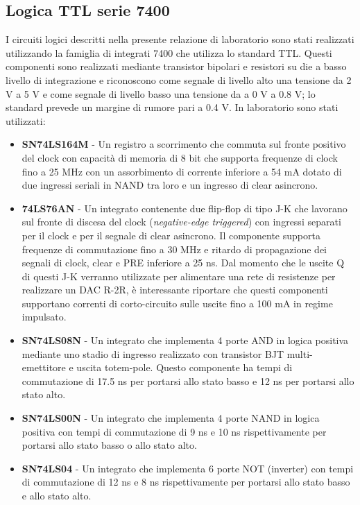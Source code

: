 \documentclass[journal]{IEEEtran}
\begin{document}
\subsection{Logica TTL serie 7400}
I circuiti logici descritti nella presente relazione di laboratorio sono stati realizzati utilizzando la famiglia di integrati 7400 che utilizza lo standard TTL. Questi componenti sono realizzati mediante transistor bipolari e resistori su die a basso livello di integrazione e riconoscono come segnale di livello alto una tensione da 2 V a 5 V e come segnale di livello basso una tensione da a 0 V a 0.8 V; lo standard prevede un margine di rumore pari a 0.4 V. In laboratorio sono stati utilizzati:
\begin{itemize}
    \item \textbf{SN74LS164M} - Un registro a scorrimento che commuta sul fronte positivo del clock con capacità di memoria di 8 bit che supporta frequenze di clock fino a 25 MHz con un assorbimento di corrente inferiore a 54 mA dotato di due ingressi seriali in NAND tra loro e un ingresso di clear asincrono. \cite{D}
    
    \item \textbf{74LS76AN} - Un integrato contenente due flip-flop di tipo J-K che lavorano sul fronte di discesa del clock (\textit{negative-edge triggered}) con ingressi separati per il clock e per il segnale di clear asincrono. Il componente supporta frequenze di commutazione fino a 30 MHz e ritardo di propagazione dei segnali di clock, clear e PRE inferiore a 25 ns. Dal momento che le uscite Q di questi J-K verranno utilizzate per alimentare una rete di resistenze per realizzare un DAC R-2R, è interessante riportare che questi componenti supportano correnti di corto-circuito sulle uscite fino a 100 mA in regime impulsato.
    \cite{E}
    
    \item \textbf{SN74LS08N} - Un integrato che implementa 4 porte AND in logica positiva mediante uno stadio di ingresso realizzato con transistor BJT multi-emettitore e uscita totem-pole. Questo componente ha tempi di commutazione  di 17.5 ns per portarsi allo stato basso e 12 ns per portarsi allo stato alto.
    \cite{F}
    
    \item \textbf{SN74LS00N} - Un integrato che implementa 4 porte NAND in logica positiva con tempi di commutazione di 9 ns e 10 ns rispettivamente per portarsi allo stato basso o allo stato alto.
    \cite{G}
    
    \item \textbf{SN74LS04} - Un integrato che implementa 6 porte NOT (inverter) con tempi di commutazione di 12 ns e 8 ns rispettivamente per portarsi allo stato basso e allo stato alto.
    \cite{H}
    
\end{itemize}
\end{document}
